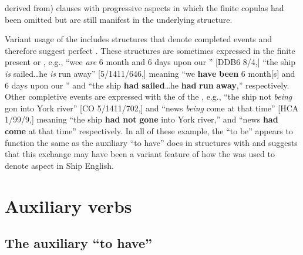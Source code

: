 derived from) clauses with progressive aspects in which the finite copulas had been omitted but are still manifest in the underlying structure. 

  Variant usage of the  includes structures that denote completed events and therefore suggest perfect . These structures are sometimes expressed in the finite present or , e.g., “wee \textit{are} 6 month and 6 days upon our ” [DDB6 8/4,] “the ship \textit{is} sailed…he \textit{is} run away” [5/1411/646,] meaning “we \textbf{have} \textbf{been} 6 month[s] and 6 days upon our ” and “the ship \textbf{had }\textbf{sailed}…he \textbf{had} \textbf{run} \textbf{away},” respectively. Other completive events are expressed with the  of the , e.g., “the  ship not \textit{being} gon into York river” [CO 5/1411/702,] and “news \textit{being} come at that time” [HCA 1/99/9,] meaning “the  ship \textbf{had} \textbf{not} \textbf{gone} into York river,” and “news \textbf{had} \textbf{come} at that time” respectively. In all of these example, the  “to be” appears to function the same as the auxiliary “to have” does in structures with  and suggests that this exchange may have been a variant feature of how the  was used to denote aspect in Ship English. 

\section{{Auxiliary} {verbs}}%

\subsection{{The} {auxiliary} {“to} {have”}}%


